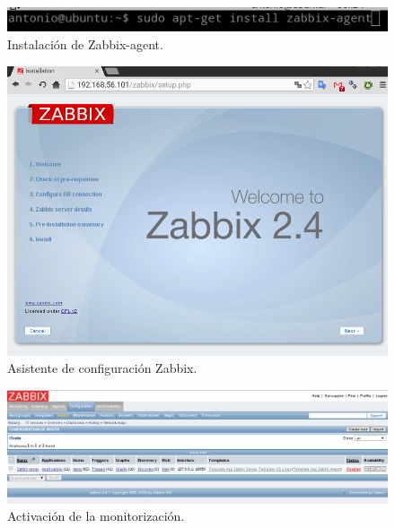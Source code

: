 \begin{figure}[H]
  \begin{center}
    \includegraphics[width=1\textwidth]{imagenes/zab9}
    \caption{Instalación de Zabbix-agent.}
    \label{fig36}
  \end{center}
\end{figure}

\begin{figure}[H]
  \begin{center}
    \includegraphics[width=1\textwidth]{imagenes/asist}
    \caption{Asistente de configuración Zabbix.}
    \label{fig37}
  \end{center}
\end{figure}

\begin{figure}[H]
  \begin{center}
    \includegraphics[width=1\textwidth]{imagenes/enable}
    \caption{Activación de la monitorización.}
    \label{fig38}
  \end{center}
\end{figure}


